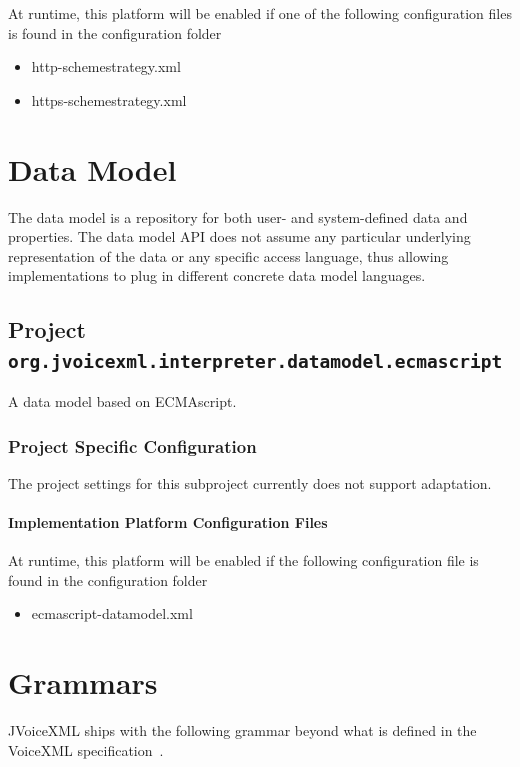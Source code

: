 \documentclass[11pt,a4paper]{article}
\begin{document}
At runtime, this platform will be enabled if one of the following configuration files is found in the configuration
folder
\begin{itemize}
\item http-schemestrategy.xml
\item https-schemestrategy.xml
\end{itemize}

\section{Data Model}

The data model is a repository for both user- and system-defined data and properties.
The data model API does not assume any particular underlying
representation of the data or any specific access language, thus allowing
implementations to plug in different concrete data model languages.


\subsection{Project \texttt{org.jvoicexml.interpreter.datamodel.ecmascript}}

A data model based on ECMAscript.

\subsubsection{Project Specific Configuration}

The project settings for this subproject currently does not support adaptation.

\paragraph{Implementation Platform Configuration Files}

At runtime, this platform will be enabled if the following configuration file is found in the configuration
folder
\begin{itemize}
\item ecmascript-datamodel.xml
\end{itemize}

\section{Grammars}

JVoiceXML ships with the following grammar beyond what is defined in the VoiceXML specification~\cite{w3.org:voicexml}.
\end{document}
